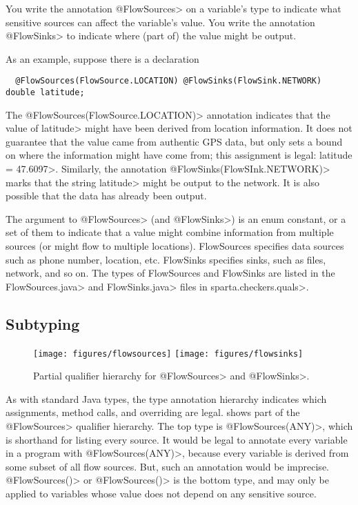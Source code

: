 You write the annotation \<@FlowSources> on a variable's
type to indicate what sensitive sources can affect the variable's value.
You write the annotation \<@FlowSinks> to indicate where (part of) the
value might be output.

As an example, suppose there is a declaration
\begin{Verbatim}
  @FlowSources(FlowSource.LOCATION) @FlowSinks(FlowSink.NETWORK) double latitude;
\end{Verbatim}
\noindent
The \<@FlowSources(FlowSource.LOCATION)> annotation indicates that the
value of \<latitude> might have been derived from
location information.  It does not guarantee that the value came from
authentic GPS data, but only sets a bound on where the information might
have come from; this assignment is legal: \<latitude = 47.6097>.
Similarly, the annotation \<@FlowSinks(FlowSInk.NETWORK)> marks that
the string \<latitude> might be output to the network.  It is also
possible that the data has already been output.

The argument to \<@FlowSources> (and \<@FlowSinks>) is an enum constant, or a
set of them to indicate that a value might combine information from
multiple sources (or might flow to multiple locations).
FlowSources specifies data sources such as phone number, location, 
etc.  FlowSinks specifies sinks, such as files, network, and so on.
The types of FlowSources and FlowSinks are listed in the
\<FlowSources.java> and \<FlowSinks.java> files in \<sparta.checkers.quals>.



\subsection{Subtyping\label{sec:subtyping}}

\begin{figure}
\centerline{\texttt{[image: figures/flowsources]}%
  \hfill%
  \texttt{[image: figures/flowsinks]}}
\caption{Partial qualifier hierarchy for \<@FlowSources> and \<@FlowSinks>.}
\label{fig:flow-hierarchy}
\end{figure}

As with standard Java types, the type annotation hierarchy indicates which
assignments, method calls, and overriding are legal.  
shows part of the \<@FlowSources>
qualifier hierarchy.  The top type is \<@FlowSources(ANY)>, which is
shorthand for listing every source.  It would be legal to annotate every
variable in a program with \<@FlowSources(ANY)>, because every variable is
derived from some subset of all flow sources.  But, such an annotation
would be imprecise.  \<@FlowSources(\ttcbs)> or \<@FlowSources()> is the
bottom type, and may only
be applied to variables whose value does not depend on any sensitive
source.


